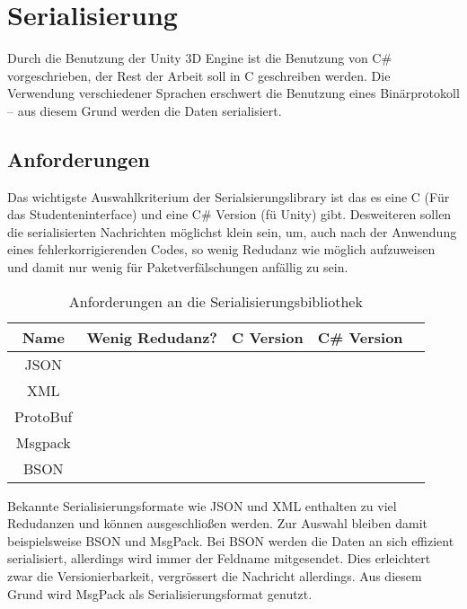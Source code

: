 \documentclass[
    12pt,
    bibliography=totoc,
    ngerman
]{scrartcl}
\newcommand{\xmark}{\text{\sffamily X}} %
\begin{document}
\clearpage
\section{Serialisierung}
Durch die Benutzung der Unity 3D Engine ist die Benutzung von C\# vorgeschrieben, der Rest der Arbeit soll in C geschreiben werden. Die Verwendung verschiedener Sprachen erschwert die Benutzung eines
Bin{\"{a}}rprotokoll -- aus diesem Grund werden die Daten serialisiert.

\subsection{Anforderungen}
Das wichtigste Auswahlkriterium der Serialsierungslibrary ist das es eine C (F{\"{u}}r das Studenteninterface) und eine C\# Version (f{\"{u}} Unity) gibt.
Desweiteren sollen die serialisierten Nachrichten m{\"{o}}glichst klein sein, um, auch nach der Anwendung
eines fehlerkorrigierenden Codes, so wenig Redudanz wie m{\"{o}}glich aufzuweisen und damit nur wenig f{\"{u}}r Paketverf{\"{a}}lschungen anf{\"{a}}llig zu sein.

\begin{table}[h]
\centering
\begin{tabu}{c | c | c | c | p{5cm}}
	\toprule
	Name & Wenig Redudanz? & C Version & C\# Version \\
	\midrule
	JSON & \xmark & \checkmark & \checkmark \\
	XML & \xmark & \checkmark & \checkmark \\
	ProtoBuf & \checkmark & \xmark\footnotemark & \checkmark \\
	Msgpack\cite{msgpack} & \checkmark & \checkmark & \checkmark \\
	BSON & \checkmark & \checkmark & \checkmark \\
	\bottomrule
\end{tabu}
\caption{Anforderungen an die Serialisierungsbibliothek}
\end{table}

Bekannte Serialisierungsformate wie JSON und XML enthalten zu viel Redudanzen und k{\"{o}}nnen ausgeschlio{\ss}en werden. Zur Auswahl bleiben damit beispielsweise BSON und MsgPack.
Bei BSON werden die Daten an sich effizient serialisiert, allerdings wird immer der Feldname mitgesendet. Dies erleichtert zwar die Versionierbarkeit, vergr{\"{o}}ssert
die Nachricht allerdings. Aus diesem Grund wird MsgPack als Serialisierungsformat genutzt.
\end{document}
